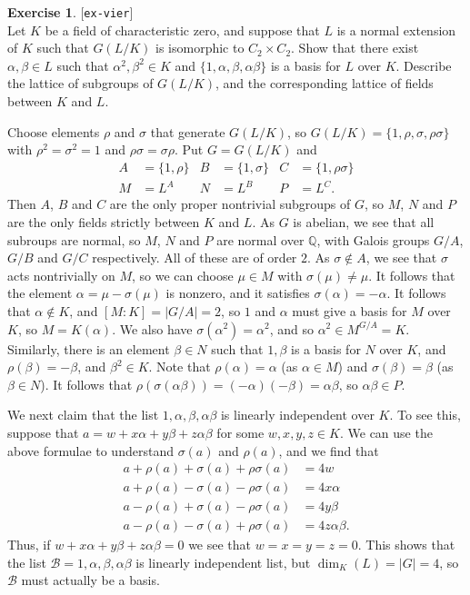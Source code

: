 \documentclass{amsart}
\newcommand{\Q}         {{\mathbb{Q}}}
\newcommand{\al}        {\alpha}
\newcommand{\bt}        {\beta}
\newcommand{\sg}        {\sigma}
\newcommand{\CB}        {{\mathcal{B}}}
\newcommand{\tm}        {\times}
\renewcommand{\:}{\colon}
\newcommand{\lastexlabel}{}
\newcommand{\exlabel}[1]{
 \global\def\lastexlabel{#1}\label{#1}[\texttt{#1}]\ \\
}
\newcommand{\exlabel}[1]{
 \global\def\lastexlabel{#1}\label{#1}
}
\newenvironment{solution}{\SolutionInline}{\endSolutionInline}
\theoremstyle{definition}
\newtheorem{exercise}{Exercise}[section]
\renewenvironment{solution}{\SolutionAtEnd}{\endSolutionAtEnd}
\begin{document}
\begin{exercise}\exlabel{ex-vier}
 Let $K$ be a field of characteristic zero, and suppose that $L$ is a
 normal extension of $K$ such that $G(L/K)$ is isomorphic to
 $C_2\tm C_2$.  Show that there exist $\al,\bt\in L$ such that
 $\al^2,\bt^2\in K$ and $\{1,\al,\bt,\al\bt\}$ is a basis for $L$ over
 $K$.  Describe the lattice of subgroups of $G(L/K)$, and the
 corresponding lattice of fields between $K$ and $L$.
\end{exercise}
\begin{solution}
 Choose elements $\rho$ and $\sg$ that generate $G(L/K)$, so
 $G(L/K)=\{1,\rho,\sg,\rho\sg\}$ with $\rho^2=\sg^2=1$ and
 $\rho\sg=\sg\rho$.  Put $G=G(L/K)$ and 
 \begin{align*}
  A &= \{1,\rho\} & B &= \{1,\sg\} & C &= \{1,\rho\sg\} \\
  M &= L^A & N &= L^B & P &= L^C.
 \end{align*}
 Then $A$, $B$ and $C$ are the only proper nontrivial subgroups of
 $G$, so $M$, $N$ and $P$ are the only fields strictly between $K$ and
 $L$.  As $G$ is abelian, we see that all subroups are normal, so $M$,
 $N$ and $P$ are normal over $\Q$, with Galois groups $G/A$, $G/B$ and
 $G/C$ respectively.  All of these are of order $2$.  As
 $\sg\not\in A$, we see that $\sg$ acts nontrivially on $M$, so we can
 choose $\mu\in M$ with $\sg(\mu)\neq\mu$.  It follows that the
 element $\al=\mu-\sg(\mu)$ is nonzero, and it satisfies
 $\sg(\al)=-\al$.  It follows that $\al\not\in K$, and
 $[M:K]=|G/A|=2$, so $1$ and $\al$ must give a basis for $M$ over $K$,
 so $M=K(\al)$.  We also have $\sg(\al^2)=\al^2$, and so $\al^2\in
 M^{G/A}=K$.  Similarly, there is an element $\bt\in N$ such that
 $1,\bt$ is a basis for $N$ over $K$, and $\rho(\bt)=-\bt$, and
 $\bt^2\in K$.  Note that $\rho(\al)=\al$ (as $\al\in M$) and
 $\sg(\bt)=\bt$ (as $\bt\in N$).  It follows that
 $\rho(\sg(\al\bt))=(-\al)(-\bt)=\al\bt$, so $\al\bt\in P$.

 We next claim that the list $1,\al,\bt,\al\bt$ is linearly
 independent over $K$.  To see this, suppose that
 $a=w+x\al+y\bt+z\al\bt$ for some $w,x,y,z\in K$.  We can use the
 above formulae to understand $\sg(a)$ and $\rho(a)$, and we find that 
 \begin{align*}
  a+\rho(a)+\sg(a)+\rho\sg(a) &= 4w \\
  a+\rho(a)-\sg(a)-\rho\sg(a) &= 4x\al \\
  a-\rho(a)+\sg(a)-\rho\sg(a) &= 4y\bt \\
  a-\rho(a)-\sg(a)+\rho\sg(a) &= 4z\al\bt.
 \end{align*}
 Thus, if $w+x\al+y\bt+z\al\bt=0$ we see that $w=x=y=z=0$.  This shows
 that the list $\CB=1,\al,\bt,\al\bt$ is linearly independent list, but
 $\dim_K(L)=|G|=4$, so $\CB$ must actually be a basis. 


\end{solution}
\end{document}
